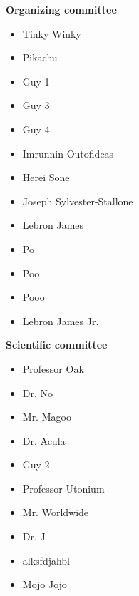 

\begin{minipage}[t]{0.5\textwidth}
{\LARGE \textbf{Organizing committee}}
\vspace{0.5cm}
\par\noindent
\begin{itemize}
    \item Tinky Winky
    \item Pikachu
    \item Guy 1
    \item Guy 3
    \item Guy 4
    \item Imrunnin Outofideas
    \item Herei Sone
    \item Joseph Sylvester-Stallone
    \item Lebron James
    \item Po
    \item Poo
    \item Pooo
    \item Lebron James Jr.
\end{itemize}
\end{minipage}\hfill
\begin{minipage}[t]{0.5\textwidth}
{\LARGE \textbf{Scientific committee}}
\vspace{0.5cm}
\par\noindent
\begin{itemize}
    \item Professor Oak
    \item Dr. No
    \item Mr. Magoo
    \item Dr. Acula
    \item Guy 2
    \item Professor Utonium
    \item Mr. Worldwide
    \item Dr. J
    \item alksfdjahbl
    \item Mojo Jojo
\end{itemize}
\end{minipage}\hfill
